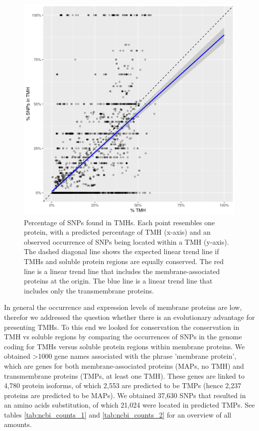 \begin{figure}[!htbp]
  \includegraphics[width=\textwidth]{ncbi_peregrine_results/fig_f_snps_found_and_expected.png}
  \caption{
    Percentage of SNPs found in TMHs.
    Each point resembles one protein, with a predicted percentage of
    TMH (x-axis) and an observed occurrence of SNPs being located
    within a TMH (y-axis).
    The dashed diagonal line shows the expected linear trend line
    if TMHs and soluble protein regions are equally conserved.
    The red line is a linear trend line that includes the membrane-associated
    proteins at the origin. 
    The blue line is a linear trend line that includes only the
    transmembrane proteins.
  }
  \label{fig:f_snps_found_and_expected}
\end{figure}

In general the occurrence and expression levels of membrane proteins are low, therefor we addressed the question whether there is an evolutionary advantage for presenting TMHs. To this end we looked for conservation the conservation in TMH vs soluble regions by comparing the occurrences of SNPs in the genome coding for TMHs versus soluble protein regions within membrane proteins.
We obtained >1000 gene names associated with the phrase 'membrane protein',
which are genes for both membrane-associated proteins (MAPs, no TMH) and 
transmembrane proteins (TMPs, at least one TMH).
These genes are linked to 4,780 protein isoforms, 
of which 2,553 are predicted to be TMPs (hence 
2,237 proteins are predicted to be MAPs).
We obtained 37,630 SNPs that resulted in an
amino acids substitution, of which 21,024 were located 
in predicted TMPs.
See tables \ref{tab:ncbi_counts_1} and \ref{tab:ncbi_counts_2} 
for an overview of all amounts.

